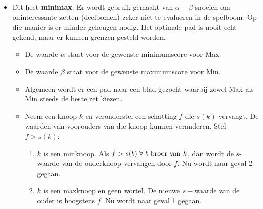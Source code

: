 \begin{itemize}
\begin{itemize}
\begin{enumerate}
		\end{enumerate} 
		\item Dit heet \textbf{minimax}. Er wordt gebruik gemaakt van $\alpha-\beta$ snoeien om oninteressante zetten (deelbomen) zeker niet te evalueren in de spelboom. Op die manier is er minder geheugen nodig. Het optimale pad is nooit echt gekend, maar er kunnen grenzen gesteld worden.
		\begin{itemize}
			\item De waarde $\alpha$ staat voor de gewenste minimumscore voor Max.
			\item De waarde $\beta$ staat voor de gewenste maximumscore voor Min.  
			\item Algemeen wordt er een pad naar een blad gezocht waarbij zowel Max als Min steeds de beste zet kiezen.
			\item Neem een knoop $k$ en veronderstel een schatting $f$ die $s(k)$ vervangt. De waarden van voorouders van die knoop kunnen veranderen. Stel $f > s(k)$:
			\begin{enumerate}
				\item $k$ is een minknoop. Als $f >  s(b)\;\forall\;b \hbox{ broer van } k$, dan wordt de $s$-waarde van de ouderknoop vervangen door $f$. Nu wordt naar geval 2 gegaan.
				\item $k$ is een maxknoop en geen wortel. De nieuwe $s-$waarde van de ouder is hoogstens $f$. Nu wordt naar geval 1 gegaan.
			\end{enumerate}
		\end{itemize}
	\end{itemize}
\end{itemize}